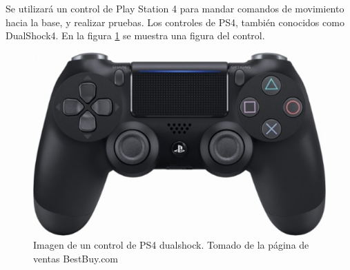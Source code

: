 Se utilizará un control de Play Station 4 para mandar comandos de movimiento hacia la base, y realizar pruebas. Los controles de PS4, también conocidos como DualShock4. En la figura \ref{F:dualshock} se muestra una figura del control.

\begin{figure}[H]
\centering
\includegraphics[scale=0.5]{imagenes/dualshock4.jpg}
\caption{Imagen de un control de PS4 dualshock. Tomado de la página de ventas BestBuy.com}
\label{F:dualshock}
\end{figure}

